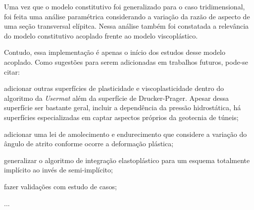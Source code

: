 Uma vez que o modelo constitutivo foi generalizado para o caso tridimensional, foi feita uma análise paramétrica considerando a variação da razão de aspecto de uma seção transversal elípitca. Nessa análise também foi constatada a relevância do modelo constitutivo acoplado frente ao modelo viscoplástico.

Contudo, essa implementação é apenas o início dos estudos desse modelo acoplado. Como sugestões para serem adicionadas em trabalhos futuros, pode-se citar:

\begin{alineas}
	
	\item adicionar outras superfícies de plasticidade e viscoplasticidade dentro do algoritmo da \textit{Usermat} além da superfície de Drucker-Prager. Apesar dessa superfície ser bastante geral, incluir a dependência da pressão hidrostática, há superfícies especializadas em captar aspectos próprios da geotecnia de túneis;
	
	\item adicionar uma lei de amolecimento e endurecimento que considere a variação do ângulo de atrito conforme ocorre a deformação plástica;
	
	\item generalizar o algoritmo de integração elastoplástico para um esquema totalmente implícito ao invés de semi-implícito;
	
	\item fazer validações com estudo de casos;
	
	\item ...
	
\end{alineas}
